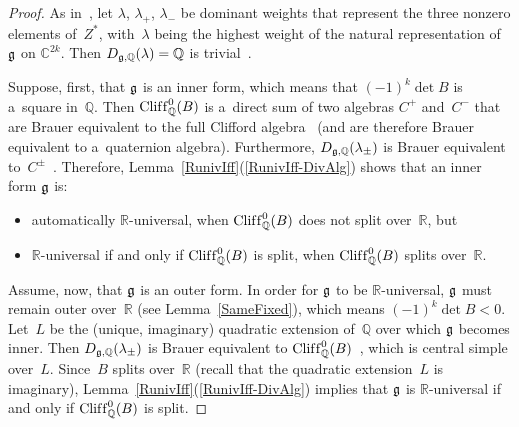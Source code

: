 \begin{proof}
As in~\cite[\S~27B, type~$D_n$, p.~379]{KnusEtAl-BookOfInvols}, let $\lambda$, $\lambda_+$, $\lambda_-$ be dominant weights
that represent the three nonzero elements of~$Z^*$, with~$\lambda$ being the highest weight of the natural
representation of~$\Lie G$ on $\mathbb{C}^{2k}$.
Then $D_{\Lie G, \mathbb{Q}}(\lambda) = \mathbb{Q}$ is trivial~\cite[p.~379]{KnusEtAl-BookOfInvols}.

Suppose, f\/irst, that $\Lie G$ is an inner form, which means that $(-1)^k \det B$ is a~square in~$\mathbb{Q}$.
Then $\operatorname{Clif\/f}^0_\mathbb{Q}(B)$ is a~direct sum of two algebras $C^+$ and~$C^-$ that are Brauer equivalent to the full
Clif\/ford algebra~\cite[Theorem~2.5(3), p.~110]{Lam-IntroQuadForms} (and are therefore Brauer equivalent to a~quaternion
algebra).
Furthermore, $D_{\Lie G, \mathbb{Q}}(\lambda_{\pm})$ is Brauer equivalent
to~$C^\pm$~\cite[p.~379]{KnusEtAl-BookOfInvols}.
Therefore, Lemma~\ref{RunivIff}(\ref{RunivIff-DivAlg}) shows that an inner form $\Lie G$ is:
\begin{itemize}\itemsep=0pt
\item automatically $\mathbb{R}$-universal, when $\operatorname{Clif\/f}^0_\mathbb{Q}(B)$ does not split over~$\mathbb{R}$, but
\item $\mathbb{R}$-universal if and only if $\operatorname{Clif\/f}^0_\mathbb{Q}(B)$ is split, when $\operatorname{Clif\/f}^0_\mathbb{Q}(B)$ splits
over~$\mathbb{R}$.
\end{itemize}

Assume, now, that $\Lie G$ is an outer form.
In order for $\Lie G$ to be $\mathbb{R}$-universal, $\Lie G$ must remain outer over~$\mathbb{R}$ (see Lemma~\ref{SameFixed}),
which means $(-1)^k \det B < 0$.
Let~$L$ be the (unique, imaginary) quadratic extension of~$\mathbb{Q}$ over which $\Lie G$ becomes inner.
Then $D_{\Lie G, \mathbb{Q}}(\lambda_{\pm})$ is Brauer equivalent to
$\operatorname{Clif\/f}^0_\mathbb{Q}(B)$~\cite[p.~379]{KnusEtAl-BookOfInvols}, which is central simple over~$L$.
Since~$B$ splits over~$\mathbb{R}$ (recall that the quadratic extension~$L$ is
imaginary), Lemma~\ref{RunivIff}(\ref{RunivIff-DivAlg}) implies that $\Lie G$ is $\mathbb{R}$-universal if and only if
$\operatorname{Clif\/f}^0_\mathbb{Q}(B)$ is split.
\end{proof}

